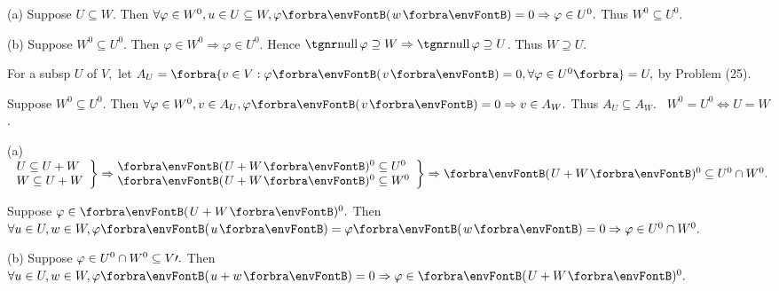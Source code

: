 \par\quad
(a) Suppose $U\subseteq W.$ Then $\forall\varphi\in W^0,u\in U\subseteq W,\varphi\Par{w}=0\Rightarrow\varphi\in U^0.$ Thus $W^0\subseteq U^0.$\par\quad
(b) Suppose $W^0\subseteq U^0.$ Then $\varphi\in W^0\Rightarrow\varphi\in U^0.$ Hence $\null\varphi\supseteq W\Rightarrow\null\varphi\supseteq U$.  Thus $W\supseteq U.$\vspace{4pt}\par\quad\Hb
\Or For a subsp $U$ of $V,$ let $A_U=\Bra{v\in V:\varphi\Par{v}=0,\forall\varphi\in U^0}=U,$ by Problem (25).\par\quad\Hb
Suppose $W^0\subseteq U^0.$ Then $\forall\varphi\in W^0,v\in A_U,\varphi\Par{v}=0\Rightarrow v\in A_W.$ Thus $A_U\subseteq A_W.$\PfEnd
\Corollary \,\,\,{\Large $W^0=U^0\Longleftrightarrow U=W$.}\par
\SepLine\pagebreak

\vspace{2pt}\par\quad
(a) $\MathRightBrace{l}{U\subseteq U+W\\W\subseteq U+W}\Rightarrow\hspace{-6pt}\MathRightBrace{l}{\Par{U+W}{^0}\subseteq U^0 \\ \Par{U+W}{^0}\subseteq W^0}\Rightarrow\Par{U+W}{^0}\subseteq U^0\cap W^0.$\vspace{4pt}\par\quad\Ha
\Or Suppose $\varphi\in\Par{U+W}{^0}.$ Then $\forall u\in U,w\in W,\varphi\Par{u}=\varphi\Par{w}=0\Rightarrow\varphi\in U^0\cap W^0.$\vspace{4pt}\par\quad
(b) Suppose $\varphi\in U^0\cap W^0\subseteq V\prime.$ Then $\forall u\in U,w\in W,\varphi\Par{u+w}=0\Rightarrow\varphi\in \Par{U+W}{^0}.$\PfEnd
\SepLine

